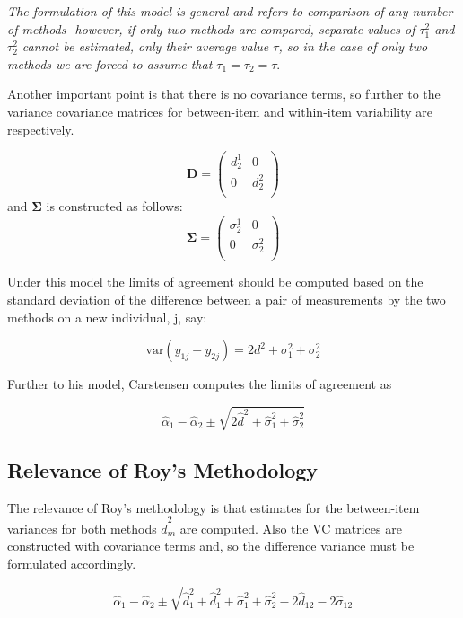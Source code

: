 \documentclass[12pt, a4paper]{report}
\theoremstyle{plain}
\theoremstyle{definition}
\theoremstyle{remark}
\begin{document}
\emph{The formulation of this model is general and refers to comparison
	of any number of methods  however, if only two methods are
	compared, separate values of $\tau^2_1$ and $\tau^2_2$ cannot be
	estimated, only their average value $\tau$, so in the case of only
	two methods we are forced to assume that $\tau_1 = \tau_2 = \tau$}\citep{bxc2008}.

Another important point is that there is no covariance terms, so
further to  \citet{bxc2008} the variance covariance matrices for
between-item and within-item variability are respectively.

\[\boldsymbol{D} = \left(
\begin{array}{cc}
d^1_2  & 0 \\
0 & d^2_2 \\
\end{array}
\right) \]
and  $\boldsymbol{\Sigma}$ is constructed as follows:
\[\boldsymbol{\Sigma} = \left(
\begin{array}{cc}
\sigma^1_2  & 0 \\
0 & \sigma^2_2 \\
\end{array}
\right) \]


Under this model the limits of agreement should be computed based
on the standard deviation of the difference between a pair of
measurements by the two methods on a new individual, j, say:

\[ \mbox{var}(y_{1j} - y_{2j}) = 2d^2 + \sigma^2_1 + \sigma^2_2  \]

Further to his model, Carstensen computes the limits of agreement
as

\[
\hat{\alpha}_1 - \hat{\alpha}_2 \pm \sqrt{2 \hat{d}^2 +
	\hat{\sigma}^2_1 + \hat{\sigma}^2_2}
\]



\subsection{Relevance of Roy's Methodology}

The relevance of Roy's methodology is that estimates for the
between-item variances for both methods $\hat{d}^2_m$ are
computed. Also the VC matrices are constructed with covariance
terms and, so the difference variance must be formulated
accordingly.


\[
\hat{\alpha}_1 - \hat{\alpha}_2 \pm \sqrt{ \hat{d}^2_1  +
	\hat{d}^2_1 + \hat{\sigma}^2_1 + \hat{\sigma}^2_2 - 2 \hat{d}_{12}
	- 2 \hat{\sigma}_12}
\]
\end{document}
